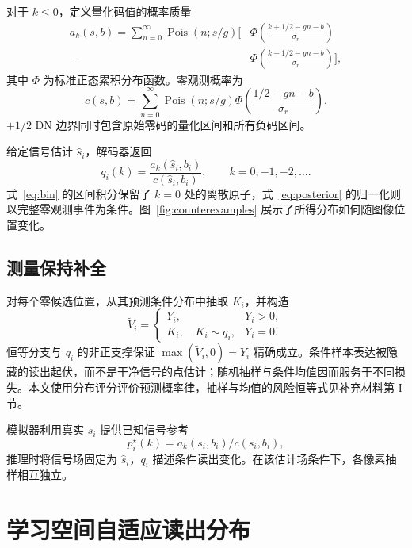 \documentclass[10pt,twocolumn,journal]{IEEEtran}
\begin{document}
对于 $k\leq0$，定义量化码值的概率质量
\begin{align}
a_k(s,b)=\sum_{n=0}^{\infty}\operatorname{Pois}(n;s/g)
\bigg[&\Phi\!\left(\frac{k+1/2-gn-b}{\sigma_r}\right)\nonumber\\[-2pt]
-&\Phi\!\left(\frac{k-1/2-gn-b}{\sigma_r}\right)\bigg],\label{eq:bin}
\end{align}
其中 $\Phi$ 为标准正态累积分布函数。零观测概率为
\begin{equation}
c(s,b)=\sum_{n=0}^{\infty}\operatorname{Pois}(n;s/g)
\Phi\!\left(\frac{1/2-gn-b}{\sigma_r}\right).\label{eq:zeroevent}
\end{equation}
$+1/2$ DN 边界同时包含原始零码的量化区间和所有负码区间。

给定信号估计 $\hat s_i$，解码器返回
\begin{equation}
q_i(k)=\frac{a_k(\hat s_i,b_i)}{c(\hat s_i,b_i)},\qquad k=0,-1,-2,\ldots.\label{eq:posterior}
\end{equation}
式~\eqref{eq:bin} 的区间积分保留了 $k=0$ 处的离散原子，式~\eqref{eq:posterior} 的归一化则以完整零观测事件为条件。图~\ref{fig:counterexamples} 展示了所得分布如何随图像位置变化。

\subsection{测量保持补全}
对每个零候选位置，从其预测条件分布中抽取 $K_i$，并构造
\begin{equation}
\widetilde V_i=\begin{cases}
Y_i,&Y_i>0,\\
K_i,\quad K_i\sim q_i,&Y_i=0.
\end{cases}\label{eq:output}
\end{equation}
恒等分支与 $q_i$ 的非正支撑保证 $\max(\widetilde V_i,0)=Y_i$ 精确成立。条件样本表达被隐藏的读出起伏，而不是干净信号的点估计；随机抽样与条件均值因而服务于不同损失。本文使用分布评分评价预测概率律，抽样与均值的风险恒等式见补充材料第 I 节。

模拟器利用真实 $s_i$ 提供已知信号参考
\begin{equation}
p^{\star}_i(k)=a_k(s_i,b_i)/c(s_i,b_i),\label{eq:oracle}
\end{equation}
推理时将信号场固定为 $\hat s_i$，$q_i$ 描述条件读出变化。在该估计场条件下，各像素抽样相互独立。

\section{学习空间自适应读出分布}
\end{document}
